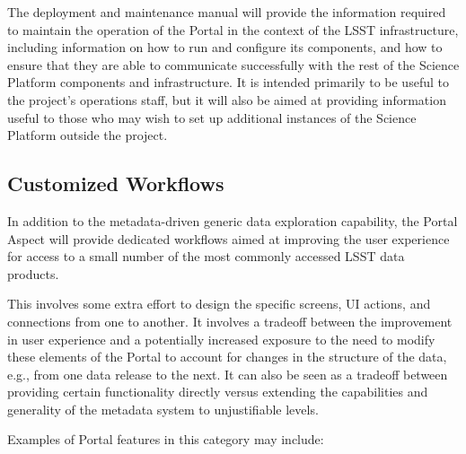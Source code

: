 The deployment and maintenance manual will provide the information required to maintain the operation of the Portal in the context of the LSST infrastructure, including information on how to run and configure its components, and how to ensure that they are able to communicate successfully with the rest of the Science Platform components and infrastructure.
It is intended primarily to be useful to the project's operations staff, but it will also be aimed at providing information useful to those who may wish to set up additional instances of the Science Platform outside the project.

\subsection{Customized Workflows}\label{customized-workflows}

In addition to the metadata-driven generic data exploration capability, the Portal Aspect will provide dedicated workflows aimed at improving the user experience for access to a small number of the most commonly accessed LSST data products.

This involves some extra effort to design the specific screens, UI actions, and connections from one to another.
It involves a tradeoff between the improvement in user experience and a potentially increased exposure to the need to modify these elements of the Portal to account for changes in the structure of the data, e.g., from one data release to the next.
It can also be seen as a tradeoff between providing certain functionality directly versus extending the capabilities and generality of the metadata system to unjustifiable levels.

Examples of Portal features in this category may include:


